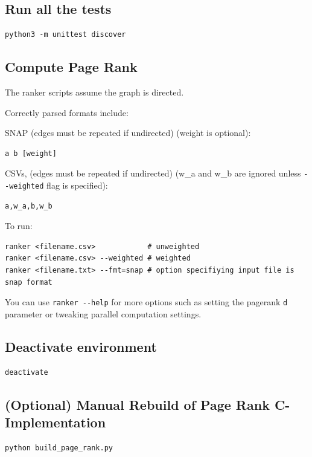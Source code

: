 \documentclass{report}
\begin{document}
\subsection{Run all the tests}
\begin{lstlisting}
python3 -m unittest discover
\end{lstlisting}

\subsection{Compute Page Rank}
The ranker scripts assume the graph is directed.

Correctly parsed formats include:

SNAP (edges must be repeated if undirected) (weight is optional):
\begin{verbatim}
a b [weight]
\end{verbatim}
CSVs, (edges must be repeated if undirected) (w\_a and w\_b are ignored unless
\verb+--weighted+ flag is specified):
\begin{verbatim}
a,w_a,b,w_b
\end{verbatim}

To run:
\begin{lstlisting}
ranker <filename.csv>            # unweighted
ranker <filename.csv> --weighted # weighted
ranker <filename.txt> --fmt=snap # option specifiying input file is snap format
\end{lstlisting}

You can use \verb+ranker --help+ for more options such as setting the pagerank \verb+d+
parameter or tweaking parallel computation settings.

\subsection{Deactivate environment}
\begin{lstlisting}
deactivate
\end{lstlisting}

\subsection{(Optional) Manual Rebuild of Page Rank C-Implementation}
\begin{lstlisting}
python build_page_rank.py
\end{lstlisting}
\end{document}
